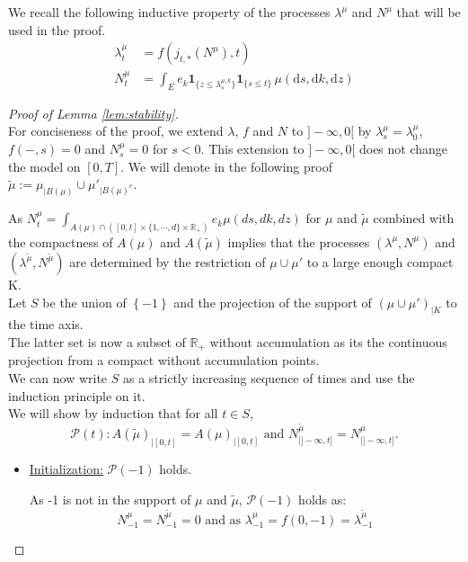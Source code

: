 \documentclass{article} %
\newcommand{\1}{\mathbbm{1}} %
\newcommand{\diff}{\mathrm{d}}
\newcommand{\R}{\mathbb{R}}
\newcommand{\ind}{\mathbf{1}}
\newcommand{\diff}{\mathrm{d}}
\begin{document}
\begin{as}
\stability*

We recall the following inductive property of the processes $\lambda^\mu$ and $N^\mu$ that will be used in the proof.
\begin{align*}
    \lambda^\mu_t &= f(j_{t,*}(N^\mu), t) \\
    N^\mu_t &= \int_E e_k \ind_{\{z \le \lambda^{\mu,k}_s\}} \ind_{ \{s \leq t \} } \, \mu(\diff s, \diff k ,\diff z)
\end{align*}

\begin{proof}[Proof of Lemma \ref{lem:stability}]
    \leavevmode \\
    For conciseness of the proof, we extend $\lambda$, $f$ and $N$ to $]-\infty, 0 [$ by $\lambda^\mu_s = \lambda^\mu_0$, $f(-,s) = 0$ and $N^\mu_s = 0$ for $s<0$. This extension to $]-\infty,0[$ does not change the model on $[0,T]$. We will denote in the following proof $\tilde{\mu} := \mu_{|B(\mu)} \cup \mu'_{|B(\mu)^c}$.
    
    As $N^\mu_t = \int_{A(\mu) \cap ([0,t] \times \{ 1,\cdots, d \} \times \R_+)} e_k \mu(ds, dk, dz)$ for $\mu$ and $\tilde{\mu}$ combined with the compactness of $A(\mu)$ and $A(\tilde{\mu})$ implies that the processes $(\lambda^\mu, N^\mu)$ and $(\lambda^{\tilde{\mu}}, N^{\tilde{\mu}})$ are determined by the restriction of $\mu \cup \mu'$ to a large enough compact K.\\
    Let $S$ be the union of $\left \{ -1 \right \}$ and the projection of the support of $(\mu \cup \mu')_{|K}$ to the time axis. \\
    The latter set is now a subset of $\R_+$ without accumulation as its the continuous projection from a compact without accumulation points. \\
    We can now write $S$ as a strictly increasing sequence of times and use the induction principle on it. \\
    We will show by induction that for all $t \in S$, $$\mathcal{P}(t): A(\tilde{\mu})_{|[0,t]} = A(\mu)_{|[0,t]} \text{ and } N^{\tilde{\mu}}_{|]-\infty,t]} = N^{\mu}_{|]-\infty,t]}.$$

    \begin{itemize}
        \item \underline{Initialization:} $\mathcal{P}(-1)$ holds.
        
        As -1 is not in the support of $\mu$ and $\tilde{\mu}$, $\mathcal{P}(-1)$ holds as:
        $$N^\mu_{-1} = N^{\tilde{\mu}}_{-1} = 0 \text{ and as } \lambda_{-1}^\mu = f(0, -1) = \lambda_{-1}^{\tilde{\mu}}$$


\end{itemize}
\end{proof}
\end{as}
\end{document}
